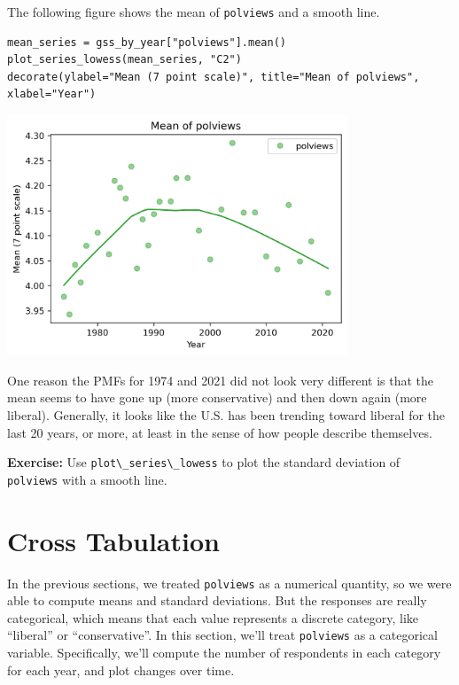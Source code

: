 The following figure shows the mean of
\passthrough{\lstinline!polviews!} and a smooth line.

\begin{lstlisting}[]
mean_series = gss_by_year["polviews"].mean()
plot_series_lowess(mean_series, "C2")
decorate(ylabel="Mean (7 point scale)", title="Mean of polviews", xlabel="Year")
\end{lstlisting}

\begin{center}
\includegraphics[width=4in]{chapters/02_polviews_soln_files/02_polviews_soln_59_0.png}
\end{center}

One reason the PMFs for 1974 and 2021 did not look very different is
that the mean seems to have gone up (more conservative) and then down
again (more liberal). Generally, it looks like the U.S. has been
trending toward liberal for the last 20 years, or more, at least in the
sense of how people describe themselves.

\textbf{Exercise:} Use \passthrough{\lstinline!plot\_series\_lowess!} to
plot the standard deviation of \passthrough{\lstinline!polviews!} with a
smooth line.

\hypertarget{cross-tabulation}{%
\section{Cross Tabulation}\label{cross-tabulation}}

In the previous sections, we treated \passthrough{\lstinline!polviews!}
as a numerical quantity, so we were able to compute means and standard
deviations. But the responses are really categorical, which means that
each value represents a discrete category, like ``liberal'' or
``conservative''. In this section, we'll treat
\passthrough{\lstinline!polviews!} as a categorical variable.
Specifically, we'll compute the number of respondents in each category
for each year, and plot changes over time.

